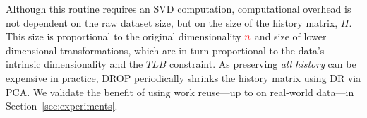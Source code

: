Although this routine requires an SVD computation, computational overhead is not dependent on the raw dataset size, but on the size of the history matrix, $H$.
This size is proportional to the original dimensionality ${\color{red}n}$ and size of lower dimensional transformations, which are in turn proportional to the data's intrinsic dimensionality and the $TLB$ constraint.
As preserving \emph{all history} can be expensive in practice, 
DROP periodically shrinks the history matrix using DR via PCA. 
We validate the benefit of using work reuse---up to  on real-world data---in Section~\ref{sec:experiments}.

